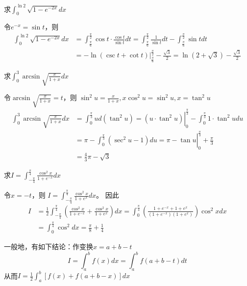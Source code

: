 \documentclass{article}
\begin{document}
\begin{examplle}[]
求\(\displaystyle\int_0^{\ln2}\sqrt{1-e^{-2x}}dx\)

令\(e^{-x}=\sin t\)，则
\begin{align*}
\int_0^{\ln2}\sqrt{1-e^{-2x}}dx&=
\int_{\frac{\pi}{6}}^{\frac{\pi}{2}}\cos t\cdot\frac{\cos t}{\sin t}dt=
\int_{\frac{\pi}{6}}^{\frac{\pi}{2}}\frac{1}{\sin t}dt-
\int_{\frac{\pi}{6}}^{\frac{\pi}{2}}\sin tdt\\
&=-\ln(\csc t+\cot t)\rvert_{\frac{\pi}{6}}^{\frac{\pi}{2}}-\frac{\sqrt{3}}{2}
=\ln(2+\sqrt{3})-\frac{\sqrt{3}}{2}
\end{align*}
\end{examplle}

\begin{examplle}[]
求\(\displaystyle\int_0^3\arcsin\sqrt{\frac{x}{1+x}}dx\)

令\(\arcsin\sqrt{\frac{x}{1+x}}=t\)，则
\(\sin^2u=\frac{x}{1+x},x\cos^2u=\sin^2u,x=\tan^2u\)
\begin{align*}
\int_0^3\arcsin\sqrt{\frac{x}{1+x}}dx&=
\left.\int_0^{\frac{\pi}{3}}ud(\tan^2u)=(u\cdot\tan^2u)\right\rvert_0^{\frac{\pi}{3}}
-\int_0^{\frac{\pi}{3}}1\cdot\tan^2udu\\
&\left.=\pi-\int_0^{\frac{\pi}{3}}(\sec^2u-1)du=\pi-\tan u\right\rvert_0^{\frac{\pi}{3}}
+\frac{\pi}{3}\\
&=\frac{4}{3}\pi-\sqrt{3}
\end{align*}
\end{examplle}

\begin{examplle}[]
求\(I=\displaystyle\int_{-\frac{\pi}{4}}^{\frac{\pi}{4}}\frac{\cos^2x}{1+e^{-x}}dx\)

令\(x=-t\)，则
\(I=\displaystyle\int_{-\frac{\pi}{4}}^{\frac{\pi}{4}}\frac{\cos^2x}{1+e^{x}}dx\)。
因此
\begin{align*}
I&=\frac{1}{2}\int_{-\frac{\pi}{4}}^{\frac{\pi}{4}}
\left(\frac{\cos^2x}{1+e^{-x}}+\frac{\cos^2x}{1+e^{x}}
\right)dx=
\int^{\frac{\pi}{4}}_0
\left(\frac{1+e^{-x}+1+e^x}{(1+e^{-x})(1+e^x)}
\right)\cos^2xdx\\
&=\int^{\frac{\pi}{4}}_0\cos^2dx=\frac{\pi}{8}+\frac{1}{4}
\end{align*}
\end{examplle}

\begin{remark}
一般地，有如下结论：作变换\(x=a+b-t\)
\begin{equation*}
I=\int^b_af(x)dx=\int^b_af(a+b-t)dt
\end{equation*}
从而\(I=\frac{1}{2}\int^b_a[f(x)+f(a+b-x)]dx\)
\end{remark}
\end{document}
